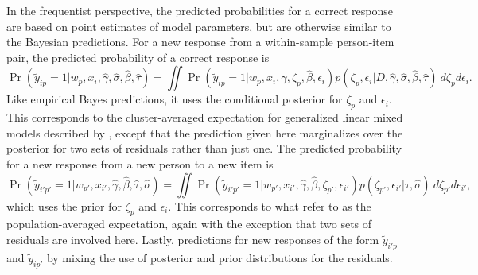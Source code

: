 \documentclass[12pt, letterpaper]{article}
\begin{document}
In the frequentist perspective, the predicted probabilities for a correct response are based on point estimates of model parameters, but are otherwise similar to the Bayesian predictions. For a new response from a within-sample person-item pair, the predicted probability of a correct response is
\begin{equation}
	\Pr(\tilde y_{ip} = 1| w_p, x_i, \hat \gamma, \hat \sigma, \hat \beta, \hat \tau) =
	\iint 
		\Pr(\tilde y_{ip} = 1| w_p, x_i, \hat \gamma, \zeta_p, \hat \beta, \epsilon_i)
		p(\zeta_p, \epsilon_i | D, \hat \gamma, \hat \sigma, \hat \beta, \hat \tau)
	~d \zeta_p d \epsilon_i
.\end{equation}
Like empirical Bayes predictions, it uses the conditional posterior for $\zeta_p$ and $\epsilon_i$. This corresponds to the cluster-averaged expectation for generalized linear mixed models described by \textcite{skrondal2009prediction}, except that the prediction given here marginalizes over the posterior for two sets of residuals rather than just one. The predicted probability for a new response from a new person to a new item is
\begin{equation}
	\Pr(\tilde y_{i'p'} = 1| w_{p'}, x_{i'}, \hat \gamma, \hat \beta, \hat \tau, \hat \sigma) =
	\iint 
		\Pr(\tilde y_{i'p'} = 1| w_{p'}, x_{i'}, \hat \gamma, \hat \beta, \zeta_{p'}, \epsilon_{i'})
		p(\zeta_{p'}, \epsilon_{i'} | \hat \tau, \hat \sigma)
	~d \zeta_{p'} d \epsilon_{i'}
,\end{equation}
which uses the prior for $\zeta_p$ and $\epsilon_i$. This corresponds to what \textcite{skrondal2009prediction} refer to as the population-averaged expectation, again with the exception that two sets of residuals are involved here. Lastly, predictions for new responses of the form $\tilde y_{i'p}$ and $\tilde y_{ip'}$ by mixing the use of posterior and prior distributions for the residuals.
\end{document}
